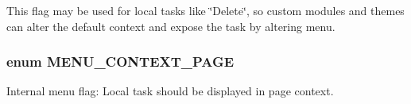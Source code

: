 This flag may be used for local tasks like \char`\"{}Delete\char`\"{}, so custom modules and themes can alter the default context and expose the task by altering menu. \hypertarget{group__menu__context__types_gaf4e86a5b19191e3dcad0257912df38cf}{
\subsubsection[{MENU\_\-CONTEXT\_\-PAGE}]{\setlength{\rightskip}{0pt plus 5cm}enum {\bf MENU\_\-CONTEXT\_\-PAGE}}}
\label{group__menu__context__types_gaf4e86a5b19191e3dcad0257912df38cf}
Internal menu flag: Local task should be displayed in page context. 
